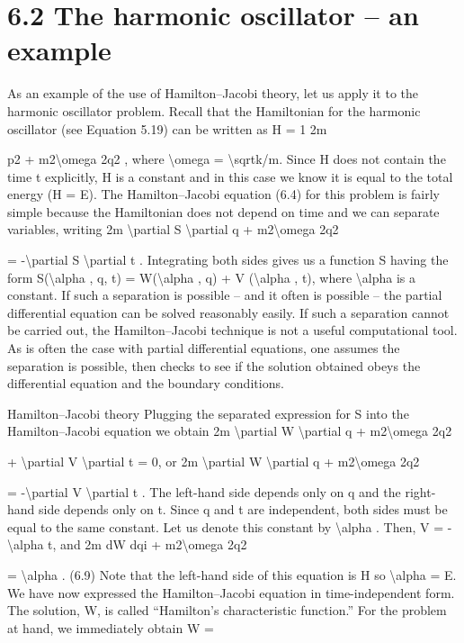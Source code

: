 \section*{6.2  The harmonic oscillator -- an example}

As an example of the use of Hamilton--Jacobi theory, let us apply it to the harmonic oscillator problem. Recall that the Hamiltonian for the harmonic oscillator (see Equation 5.19) can be written as
H = 1
2m

p2 + m2\textbackslash{}omega 2q2
,
where \textbackslash{}omega  = \textbackslash{}sqrtk/m. Since H does not contain the time t explicitly, H is a
constant and in this case we know it is equal to the total energy (H = E).
The Hamilton--Jacobi equation (6.4) for this problem is fairly simple because
the Hamiltonian does not depend on time and we can separate variables,
writing
2m
\textbackslash{}partial S
\textbackslash{}partial q
+ m2\textbackslash{}omega 2q2

= -\textbackslash{}partial S
\textbackslash{}partial t .
Integrating both sides gives us a function S having the form
S(\textbackslash{}alpha , q, t) = W(\textbackslash{}alpha , q) + V (\textbackslash{}alpha , t),
where \textbackslash{}alpha  is a constant. If such a separation is possible -- and it often is
possible -- the partial differential equation can be solved reasonably easily. If
such a separation cannot be carried out, the Hamilton--Jacobi technique is not
a useful computational tool. As is often the case with partial differential equations, one assumes the separation is possible, then checks to see if the solution
obtained obeys the differential equation and the boundary conditions.

Hamilton--Jacobi theory
Plugging the separated expression for S into the Hamilton--Jacobi equation
we obtain
2m
\textbackslash{}partial W
\textbackslash{}partial q
+ m2\textbackslash{}omega 2q2

+ \textbackslash{}partial V
\textbackslash{}partial t = 0,
or
2m
\textbackslash{}partial W
\textbackslash{}partial q
+ m2\textbackslash{}omega 2q2

= -\textbackslash{}partial V
\textbackslash{}partial t .
The left-hand side depends only on q and the right-hand side depends only
on t. Since q and t are independent, both sides must be equal to the same
constant. Let us denote this constant by \textbackslash{}alpha . Then,
V = -\textbackslash{}alpha t,
and
2m
dW
dqi
+ m2\textbackslash{}omega 2q2

= \textbackslash{}alpha .
(6.9)
Note that the left-hand side of this equation is H so \textbackslash{}alpha  = E.
We have now expressed the Hamilton--Jacobi equation in time-independent
form. The solution, W, is called ``Hamilton's characteristic function.''
For the problem at hand, we immediately obtain
W =

